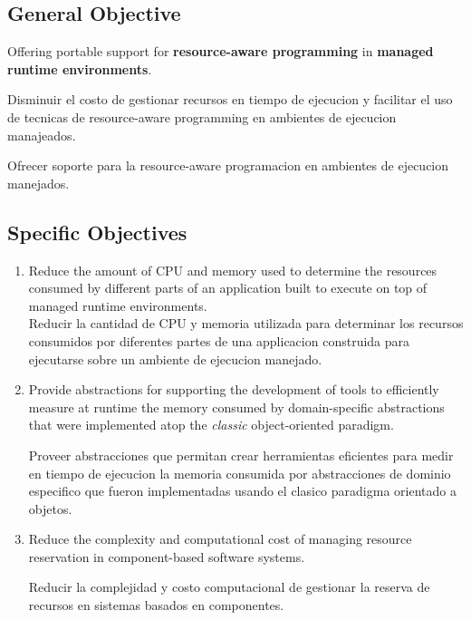 

\subsection{General Objective}
Offering portable support for \textbf{resource-aware programming} in \textbf{managed runtime environments}.

Disminuir el costo de gestionar recursos en tiempo de ejecucion y facilitar el uso de tecnicas de resource-aware programming en ambientes de ejecucion manajeados.

Ofrecer soporte para la resource-aware programacion en ambientes de ejecucion manejados. 

\subsection{Specific Objectives}
\begin{enumerate}
\item Reduce the amount of CPU and memory used to determine the resources consumed by different parts of an application built to execute on top of managed runtime environments.\\
Reducir la cantidad de CPU y memoria utilizada para determinar los recursos consumidos por diferentes partes de una applicacion construida para ejecutarse 
sobre un ambiente de ejecucion manejado.\\

\item Provide abstractions for supporting the development of tools to efficiently measure at runtime the memory consumed by domain-specific abstractions that were implemented atop the \textit{classic} object-oriented paradigm.

Proveer abstracciones que permitan crear
herramientas eficientes para medir en tiempo de ejecucion la memoria consumida por abstracciones de dominio especifico que fueron implementadas usando el clasico paradigma orientado a objetos.\\

\item Reduce the complexity and computational cost of managing resource reservation in component-based software systems.

Reducir la complejidad y costo computacional de gestionar la reserva de recursos en sistemas basados en componentes.
\end{enumerate}

